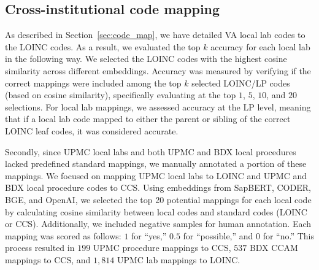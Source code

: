 \documentclass{article}
\begin{document}
\subsection{Cross-institutional code mapping}
\label{sec:code_map_supp}

As described in Section~\ref{sec:code_map}, we have detailed VA local lab codes to the LOINC codes. As a result, we evaluated the top \( k \) accuracy for each local lab in the following way. We selected the LOINC codes with the highest cosine similarity across different embeddings. Accuracy was measured by verifying if the correct mappings were included among the top \( k \) selected LOINC/LP codes (based on cosine similarity), specifically evaluating at the top $1$, $5$, $10$, and $20$ selections. For local lab mappings, we assessed accuracy at the LP level, meaning that if a local lab code mapped to either the parent or sibling of the correct LOINC leaf codes, it was considered accurate. 

Secondly, since UPMC local labs and both UPMC and BDX local procedures lacked predefined standard mappings, we manually annotated a portion of these mappings. We focused on mapping UPMC local labs to LOINC and UPMC and BDX local procedure codes to CCS. Using embeddings from SapBERT, CODER, BGE, and OpenAI, we selected the top 20 potential mappings for each local code by calculating cosine similarity between local codes and standard codes (LOINC or CCS). Additionally, we included negative samples for human annotation. Each mapping was scored as follows: $1$ for ``yes,'' $0.5$ for ``possible,'' and $0$ for ``no.'' This process resulted in $199$ UPMC procedure mappings to CCS, $537$ BDX CCAM mappings to CCS, and $1,814$ UPMC lab mappings to LOINC.
\end{document}

